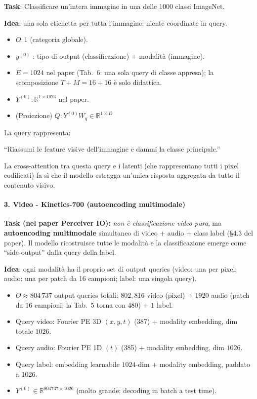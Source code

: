\documentclass[
  11pt,
]{article}
\begin{document}
\textbf{Task}: Classificare un'intera immagine in una delle 1000 classi
ImageNet.

\textbf{Idea}: una sola etichetta per tutta l'immagine;
niente coordinate in query.

\begin{itemize}
\item
  \(O:1\) (categoria globale).
\item
  \(y^{(0)}\) : tipo di output (classificazione) + modalità (immagine).
\item
  \(E = 1024\) nel paper (Tab.~6: una sola query di classe appresa); la scomposizione \(T + M = 16 + 16\) è solo didattica.
\item
  \(Y^{(0)}:\mathbb{R}^{1 \times 1024}\) nel paper.
\item
  (Proiezione) \(Q:Y^{(0)}W_{q}{\in \mathbb{R}}^{1 \times D}\)
\end{itemize}


La query rappresenta:

``Riassumi le feature visive dell'immagine e dammi la classe
principale.''

La cross-attention tra questa query e i latenti (che rappresentano tutti
i pixel codificati) fa sì che il modello estragga un'unica risposta
aggregata da tutto il contenuto visivo.


\paragraph{3. \textbf{Video - Kinetics-700 (autoencoding multimodale)}}

\textbf{Task (nel paper Perceiver IO):} \emph{non è classificazione video pura}, ma \textbf{autoencoding multimodale} simultaneo di video + audio + class label (\S4.3 del paper). Il modello ricostruisce tutte le modalità e la classificazione emerge come ``side-output'' dalla query della label.

\textbf{Idea}: ogni modalità ha il proprio set di output queries (video: una per pixel; audio: una per patch da 16 campioni; label: una singola query).

\begin{itemize}
\item \(O \approx 804\,737\) output queries totali: $802{,}816$ video (pixel) + $1920$ audio (patch da 16 campioni; la Tab.~5 torna con 480) + $1$ label.
\item Query video: Fourier PE 3D $(x, y, t)$ (387) + modality embedding, dim totale $1026$.
\item Query audio: Fourier PE 1D $(t)$ (385) + modality embedding, dim $1026$.
\item Query label: embedding learnabile $1024$-dim + modality embedding, paddato a $1026$.
\item $Y^{(0)} \in \mathbb{R}^{804737 \times 1026}$ (molto grande; decoding in batch a test time).
\end{itemize}
\end{document}
